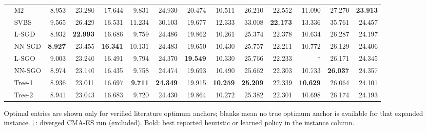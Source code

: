 \documentclass[11pt]{article}
\begin{document}
\begin{table}[!htbp]
{\begin{tabular}{llrrrrrrrrrrrr}
 & M2 & 8.953 & 23.280 & 17.644 & 9.831 & 24.930 & 20.474 & 10.511 & 26.210 & 22.552 & 11.090 & 27.270 & \textbf{23.913} \\
 & SVBS & 9.565 & 26.429 & 16.531 & 11.234 & 30.103 & 19.677 & 12.333 & 33.008 & \textbf{22.173} & 13.336 & 35.761 & 24.457 \\
 & L-SGD & 8.932 & \textbf{22.993} & 16.686 & 9.759 & 24.486 & 19.862 & 10.261 & 25.374 & 22.378 & 10.634 & 26.287 & 24.197 \\
 & NN-SGD & \textbf{8.927} & 23.455 & \textbf{16.341} & 10.131 & 24.483 & 19.650 & 10.430 & 25.757 & 22.211 & 10.772 & 26.129 & 24.406 \\
 & L-SGO & 9.003 & 23.240 & 16.491 & 9.794 & 24.370 & \textbf{19.549} & 10.330 & 25.766 & 22.233 & $\dagger$ & 26.171 & 24.345 \\
 & NN-SGO & 8.974 & 23.140 & 16.435 & 9.758 & 24.474 & 19.693 & 10.490 & 25.662 & 22.303 & 10.733 & \textbf{26.037} & 24.357 \\
 & Tree-1 & 8.936 & 23.011 & 16.697 & \textbf{9.711} & \textbf{24.349} & 19.915 & \textbf{10.259} & \textbf{25.209} & 22.339 & \textbf{10.629} & 26.064 & 24.101 \\
 & Tree-2 & 8.941 & 23.043 & 16.683 & 9.720 & 24.430 & 19.864 & 10.272 & 25.382 & 22.301 & 10.698 & 26.174 & 24.193 \\
\bottomrule
\end{tabular}}
\par\medskip\footnotesize Optimal entries are shown only for verified literature optimum anchors; blanks mean no true optimum anchor is available for that expanded instance. $\dagger$: diverged CMA-ES run (excluded). Bold: best reported heuristic or learned policy in the instance column.
\end{table}
\FloatBarrier
\end{document}
